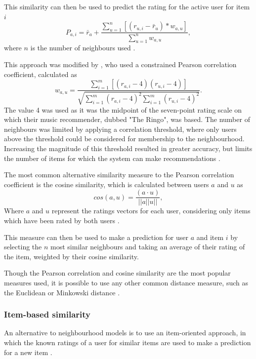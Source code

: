 This similarity can then be used to predict the rating for the active user for item $i$
\begin{equation}
    P_{a,i} = \bar{r}_a + \dfrac{\sum\limits_{u=1}^{n}[(r_{u,i}-\bar{r}_u)*w_{a,u}]}{\sum\limits_{u=1}^{n}w_{a,u}},
\end{equation}
where $n$ is the number of neighbours used \parencite{herlocker2002empirical}.

This approach was modified by \cite{shardanand1995social}, who used a constrained Pearson correlation coefficient, calculated as
\begin{equation}
    w_{a,u} = \dfrac{\sum\limits_{i=1}^{m}[(r_{a,i}-4)(r_{u,i}-4)]}{\sqrt{\sum\limits_{i=1}^{m}(r_{a,i}-4)^2\sum\limits_{i=1}^{m}(r_{u,i}-4)^2}}.
\end{equation}
The value 4 was used as it was the midpoint of the seven-point rating scale on which their music recommender, dubbed "The Ringo", was based. The number of neighbours was limited by applying a correlation threshold, where only users above the threshold could be considered for membership to the neighbourhood. Increasing the magnitude of this threshold resulted in greater accuracy, but limits the number of items for which the system can make recommendations \parencite{herlocker2002empirical}.

The most common alternative similarity measure to the Pearson correlation coefficient is the cosine similarity, which is calculated between users $a$ and $u$ as
\begin{equation}
    cos(a,u) = \dfrac{(a\cdot u)}{||a||u||},
\end{equation}
Where $a$ and $u$ represent the ratings vectors for each user, considering only items which have been rated by both users \parencite{handbook_ch2}.

This measure can then be used to make a prediction for user $a$ and item $i$ by selecting the $n$ most similar neighbours and taking an average of their rating of the item, weighted by their cosine similarity.

Though the Pearson correlation and cosine similarity are the most popular measures used, it is possible to use any other common distance measure, such as the Euclidean or Minkowski distance \parencite{handbook_ch2}.

\subsubsection{Item-based similarity}
An alternative to neighbourhood models is to use an item-oriented approach, in which the known ratings of a user for similar items are used to make a prediction for a new item \parencite{cf_1.6_implicit}.

